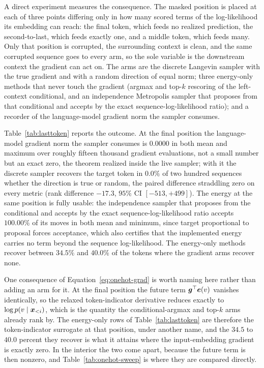 A direct experiment measures the consequence. The masked position is placed at each of three points differing only in how many scored terms of the log-likelihood its embedding can reach: the final token, which feeds no realized prediction, the second-to-last, which feeds exactly one, and a middle token, which feeds many. Only that position is corrupted, the surrounding context is clean, and the same corrupted sequence goes to every arm, so the sole variable is the downstream context the gradient can act on. The arms are the discrete Langevin sampler with the true gradient and with a random direction of equal norm; three energy-only methods that never touch the gradient (argmax and top-$k$ rescoring of the left-context conditional, and an independence Metropolis sampler that proposes from that conditional and accepts by the exact sequence-log-likelihood ratio); and a recorder of the language-model gradient norm the sampler consumes.

Table~\ref{tab:lasttoken} reports the outcome. At the final position the language-model gradient norm the sampler consumes is $0.0000$ in both mean and maximum over roughly fifteen thousand gradient evaluations, not a small number but an exact zero, the theorem realized inside the live sampler; with it the discrete sampler recovers the target token in $0.0\%$ of two hundred sequences whether the direction is true or random, the paired difference straddling zero on every metric (rank difference $-17.3$, $95\%$ CI $[-513,+499]$). The energy at the same position is fully usable: the independence sampler that proposes from the conditional and accepts by the exact sequence-log-likelihood ratio accepts $100.00\%$ of its moves in both mean and minimum, since target proportional to proposal forces acceptance, which also certifies that the implemented energy carries no term beyond the sequence log-likelihood. The energy-only methods recover between $34.5\%$ and $40.0\%$ of the tokens where the gradient arms recover none.

One consequence of Equation~\eqref{eq:onehot-grad} is worth naming here rather than adding an arm for it. At the final position the future term $\bm{g}^\top\bm{e}(v)$ vanishes identically, so the relaxed token-indicator derivative reduces exactly to $\log p(v \mid \bm{x}_{<i})$, which is the quantity the conditional-argmax and top-$k$ arms already rank by. The energy-only rows of Table~\ref{tab:lasttoken} are therefore the token-indicator surrogate at that position, under another name, and the $34.5$ to $40.0$ percent they recover is what it attains where the input-embedding gradient is exactly zero. In the interior the two come apart, because the future term is then nonzero, and Table~\ref{tab:onehot-sweep} is where they are compared directly.

